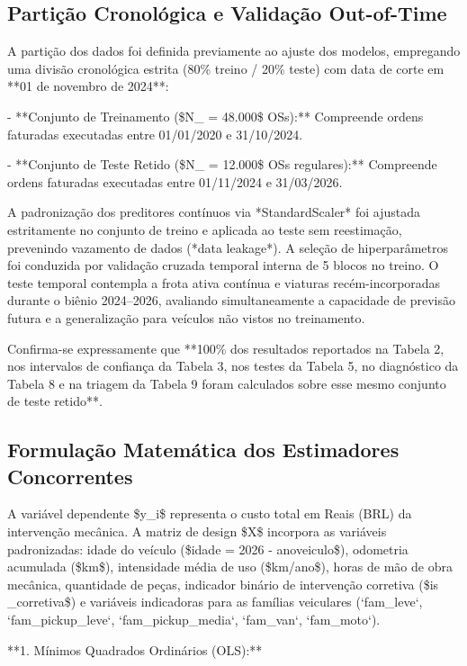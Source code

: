 \documentclass[12pt,a4paper]{article}
\begin{document}
\subsection{Partição Cronológica e Validação Out-of-Time}

A partição dos dados foi definida previamente ao ajuste dos modelos, empregando uma divisão cronológica estrita (80\% treino / 20\% teste) com data de corte em **01 de novembro de 2024**:

- **Conjunto de Treinamento (\$N\_{} = 48.000\$ OSs):** Compreende ordens faturadas executadas entre 01/01/2020 e 31/10/2024.

- **Conjunto de Teste Retido (\$N\_{} = 12.000\$ OSs regulares):** Compreende ordens faturadas executadas entre 01/11/2024 e 31/03/2026.

A padronização dos preditores contínuos via *StandardScaler* foi ajustada estritamente no conjunto de treino e aplicada ao teste sem reestimação, prevenindo vazamento de dados (*data leakage*). A seleção de hiperparâmetros foi conduzida por validação cruzada temporal interna de 5 blocos no treino. O teste temporal contempla a frota ativa contínua e viaturas recém-incorporadas durante o biênio 2024–2026, avaliando simultaneamente a capacidade de previsão futura e a generalização para veículos não vistos no treinamento.

Confirma-se expressamente que **100\% dos resultados reportados na Tabela 2, nos intervalos de confiança da Tabela 3, nos testes da Tabela 5, no diagnóstico da Tabela 8 e na triagem da Tabela 9 foram calculados sobre esse mesmo conjunto de teste retido**.


\subsection{Formulação Matemática dos Estimadores Concorrentes}

A variável dependente \$y\_i\$ representa o custo total em Reais (BRL) da intervenção mecânica. A matriz de design \$X\$ incorpora as variáveis padronizadas: idade do veículo (\$idade = 2026 - anoveiculo\$), odometria acumulada (\$km\$), intensidade média de uso (\$km/ano\$), horas de mão de obra mecânica, quantidade de peças, indicador binário de intervenção corretiva (\$is\\_corretiva\$) e variáveis indicadoras para as famílias veiculares (`fam\_leve`, `fam\_pickup\_leve`, `fam\_pickup\_media`, `fam\_van`, `fam\_moto`).

**1. Mínimos Quadrados Ordinários (OLS):**
\end{document}
